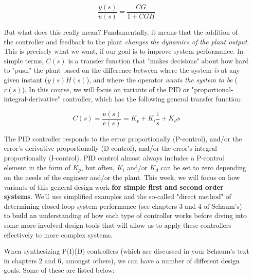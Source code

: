 \documentclass[11pt]{article}
\begin{document}
\begin{equation}
\frac{y(s)}{u(s)} = \frac{CG}{1+CGH}
\end{equation}

But what does this really mean? Fundamentally, it means that the
addition of the controller and feedback to the plant \emph{changes the
dynamics of the plant output}. This is precisely what we want, if our
goal is to improve system performance. In simple terms, \(C(s)\) is a
transfer function that "makes decisions" about how hard to "push" the
plant based on the difference between where the system \emph{is} at any
given instant (\(y(s)H(s)\)), and where the operator \emph{wants the
system to be} (\(r(s)\)). In this course, we will focus on variants of
the PID or "proportional-integral-derivative" controller, which has the
following general transfer function:

\begin{equation}
C(s) = \frac{u(s)}{e(s)}= K_p + K_i\frac{1}{s} + K_ds
\end{equation}

The PID controller responds to the error proportionally (P-control),
and/or the error's derivative proportionally (D-control), and/or the
error's integral proportionally (I-control). PID control almost always
includes a P-control element in the form of \(K_p\), but often, \(K_i\)
and/or \(K_d\) can be set to zero depending on the needs of the engineer
and/or the plant. This week, we will focus on how variants of this
general design work \textbf{for simple first and second order systems}.
We'll use simplified examples and the so-called "direct method" of
determining closed-loop system performance (see chapters 3 and 4 of
Schaum's) to build an understanding of how each type of controller works
before diving into some more involved design tools that will allow us to
apply these controllers effectively to more complex systems.

When synthesizing P(I)(D) controllers (which are discussed in your
Schaum's text in chapters 2 and 6, amongst others), we can have a number
of different design goals. Some of these are listed below:
\end{document}
